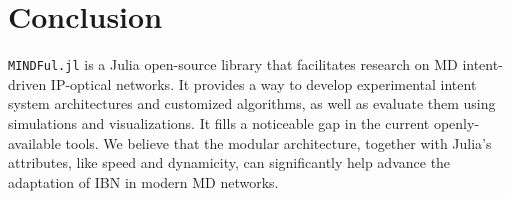 \documentclass{juliacon}
\begin{document}
\section{Conclusion}
\verb|MINDFul.jl| is a Julia open-source library that facilitates research on \ac{MD} intent-driven IP-optical networks.
It provides a way to develop experimental intent system architectures and customized algorithms, as well as evaluate them using simulations and visualizations.
It fills a noticeable gap in the current openly-available tools.
We believe that the modular architecture, together with Julia's attributes, like speed and dynamicity, can significantly help advance the adaptation of \ac{IBN} in modern \ac{MD} networks.



%




\end{document}
